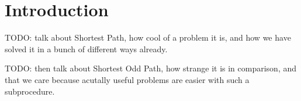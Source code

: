 \chapter{Introduction}

TODO: talk about Shortest Path, how cool of a problem it is, and how we have solved it in a bunch of different ways already.

TODO: then talk about Shortest Odd Path, how strange it is in comparison, and that we care because acutally useful problems are easier with such a subprocedure.
